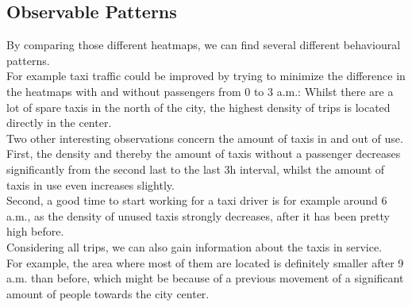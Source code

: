 \documentclass[11pt,conference,a4paper,twocolumns,romanappendices]{IEEEtran}
\begin{document}
\subsection{Observable Patterns}
By comparing those different heatmaps, we can find several different behavioural patterns. \\
For example taxi traffic could be improved by trying to minimize the difference in the heatmaps with and without passengers from 0 to 3 a.m.: Whilst there are a lot of spare taxis in the north of the city, the highest density of trips is located directly in the center. \\
Two other interesting observations concern the amount of taxis in and out of use. \\
First, the density and thereby the amount of taxis without a passenger decreases significantly from the second last to the last 3h interval, whilst the amount of taxis in use even increases slightly. \\
Second, a good time to start working for a taxi driver is for example around 6 a.m., as the density of unused taxis strongly decreases, after it has been pretty high before. \\
Considering all trips, we can also gain information about the taxis in service. \\
For example, the area where most of them are located is definitely smaller after 9 a.m. than before, which might be because of a previous movement of a significant amount of people towards the city center. \\
\end{document}
